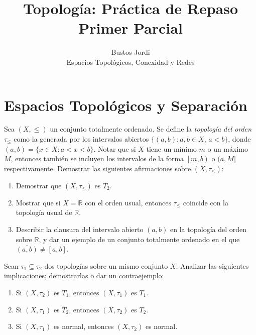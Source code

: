 \documentclass{article}
\theoremstyle{definition}
\newcommand{\R}{\mathbb{R}}
\newcommand{\cl}[1]{\overline{#1}}              %
\newcommand{\coint}[2]{\left[ #1, #2 \right)}
\newenvironment{ejercicio}[1]{\begin{trivlist}
\item[\hskip \labelsep {\bfseries Ejercicio}\hskip \labelsep {\bfseries #1.}]}{\end{trivlist}}
\begin{document}
\title{Topología: Práctica de Repaso\\Primer Parcial}
\author{Bustos Jordi\\Espacios Topológicos, Conexidad y Redes}

\maketitle

\section{Espacios Topológicos y Separación}

\begin{ejercicio}{1}
    Sea \((X, \leq)\) un conjunto totalmente ordenado. Se define la \textit{topología del orden} \(\tau_\leq \) como la generada por los intervalos abiertos \(\{ (a,b) : a, b \in X,\, a < b \}\), donde \((a,b) = \{ x \in X : a < x < b \}\).
    Notar que si \(X\) tiene un mínimo \(m\) o un máximo \(M\), entonces también se incluyen los intervalos de la forma \(\coint{m}{b}\) o \((a, M]\) respectivamente. Demostrar las siguientes afirmaciones sobre \((X, \tau_\leq)\):
    \begin{enumerate}
        \item Demostrar que \((X, \tau_\leq)\) es \(T_2\).
        \item Mostrar que si \(X = \R \) con el orden usual, entonces \(\tau_\leq \) coincide con la topología usual de \(\R \).
        \item Describir la clausura del intervalo abierto \((a,b)\) en la topología del orden sobre \(\R \), y dar un ejemplo de un conjunto totalmente ordenado en el que \(\cl{(a,b)} \neq [a,b]\).
    \end{enumerate}
\end{ejercicio}

\begin{ejercicio}{2}
    Sean \(\tau_1 \subseteq \tau_2\) dos topologías sobre un mismo conjunto \(X\). Analizar las siguientes implicaciones; demostrarlas o dar un contraejemplo:
    \begin{enumerate}
        \item Si \((X, \tau_2)\) es \(T_1\), entonces \((X, \tau_1)\) es \(T_1\).
        \item Si \((X, \tau_1)\) es \(T_2\), entonces \((X, \tau_2)\) es \(T_2\).
        \item Si \((X, \tau_1)\) es normal, entonces \((X, \tau_2)\) es normal.
    \end{enumerate}
\end{ejercicio}
\end{document}

